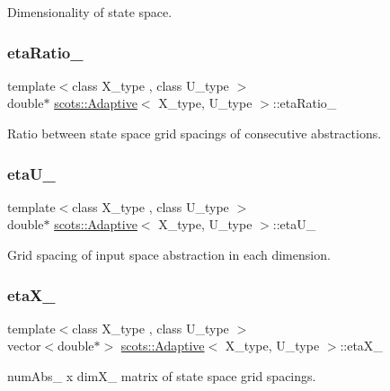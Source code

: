 Dimensionality of state space. \mbox{\label{classscots_1_1Adaptive_af0ae9692bf76a9d38cca670e9535310f}} 
\subsubsection{\texorpdfstring{eta\+Ratio\+\_\+}{etaRatio\_}}
{\footnotesize\ttfamily template$<$class X\+\_\+type , class U\+\_\+type $>$ \\
double$\ast$ \hyperlink{classscots_1_1Adaptive}{scots\+::\+Adaptive}$<$ X\+\_\+type, U\+\_\+type $>$\+::eta\+Ratio\+\_\+}

Ratio between state space grid spacings of consecutive abstractions. \mbox{\label{classscots_1_1Adaptive_acc2e430a31aa9ceb8ab6593a9eb3e91f}} 
\subsubsection{\texorpdfstring{eta\+U\+\_\+}{etaU\_}}
{\footnotesize\ttfamily template$<$class X\+\_\+type , class U\+\_\+type $>$ \\
double$\ast$ \hyperlink{classscots_1_1Adaptive}{scots\+::\+Adaptive}$<$ X\+\_\+type, U\+\_\+type $>$\+::eta\+U\+\_\+}

Grid spacing of input space abstraction in each dimension. \mbox{\label{classscots_1_1Adaptive_abe9d5faea4bd01753070599200e224c5}} 
\subsubsection{\texorpdfstring{eta\+X\+\_\+}{etaX\_}}
{\footnotesize\ttfamily template$<$class X\+\_\+type , class U\+\_\+type $>$ \\
vector$<$double$\ast$$>$ \hyperlink{classscots_1_1Adaptive}{scots\+::\+Adaptive}$<$ X\+\_\+type, U\+\_\+type $>$\+::eta\+X\+\_\+}

num\+Abs\+\_\+ x dim\+X\+\_\+ matrix of state space grid spacings. \mbox{\label{classscots_1_1Adaptive_a5a70ee2d2b4efe4f5eb20d08a596ec7b}} 
